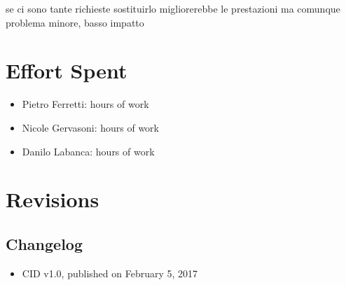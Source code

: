 \documentclass[english]{article}
\begin{document}
se ci sono tante richieste sostituirlo migliorerebbe le prestazioni
ma comunque problema minore, basso impatto

\section{Effort Spent}
\begin{itemize}
	\item{Pietro Ferretti:  hours of work}
	\item{Nicole Gervasoni:  hours of work}
	\item{Danilo Labanca:  hours of work}
\end{itemize}


\section{Revisions}

\subsection{Changelog}
\begin{itemize}
	\item{CID v1.0, published on February 5, 2017}
\end{itemize}
\end{document}
